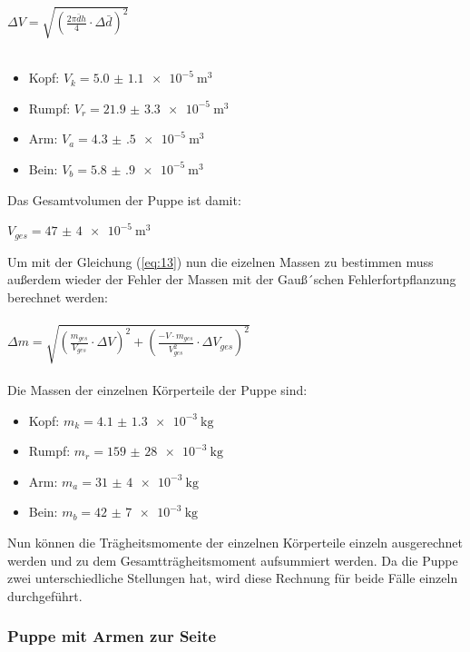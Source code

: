 $\Delta V = \sqrt{\left(\frac{2\pi\bar{d}h}{4} \cdot \Delta \bar{d} \right)^2}$\\\\

\begin{itemize}
  \item Kopf: $V_k = \SI{5.0(11)e-5}{\meter\tothe{3}}$
  \item Rumpf: $V_r = \SI{21.9(33)e-5}{\meter\tothe{3}}$
  \item Arm: $V_a = \SI{4.3(5)e-5}{\meter\tothe{3}}$
  \item Bein: $V_b = \SI{5.8(9)e-5}{\meter\tothe{3}}$
\end{itemize}

Das Gesamtvolumen der Puppe ist damit:

\centerline{$V_{ges} = \SI{47(4)e-5}{\meter\tothe{3}}$}

Um mit der Gleichung (\ref{eq:13}) nun die eizelnen Massen zu bestimmen muss außerdem wieder
der Fehler der Massen mit der Gauß´schen Fehlerfortpflanzung berechnet werden:\\\\

$\Delta m = \sqrt{\left(\frac{m_{ges}}{V_{ges}} \cdot \Delta V \right)^2
  + \left(\frac{-V\cdot m_{ges}}{V_{ges}^2} \cdot \Delta V_{ges} \right)^2}$\\\\

Die Massen der einzelnen Körperteile der Puppe sind:

\begin{itemize}
  \item Kopf: $m_k = \SI{4.1(13)e-3}{\kilo\gram}$
  \item Rumpf: $m_r = \SI{159(28)e-3}{\kilo\gram}$
  \item Arm: $m_a = \SI{31(4)e-3}{\kilo\gram}$
  \item Bein: $m_b = \SI{42(7)e-3}{\kilo\gram}$
\end{itemize}

Nun können die Trägheitsmomente der einzelnen Körperteile einzeln ausgerechnet werden
und zu dem Gesamtträgheitsmoment aufsummiert werden. Da die Puppe zwei unterschiedliche
Stellungen hat, wird diese Rechnung für beide Fälle einzeln durchgeführt.

\subsubsection{Puppe mit Armen zur Seite}

